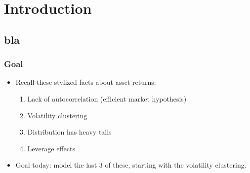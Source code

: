 

\frame{\titlepage}


\section{Introduction}\subsection*{bla}

\begin{frame}
\frametitle{Goal}
\begin{itemize}
\item Recall these stylized facts about asset returns:
\begin{enumerate}
\item Lack of autocorrelation (efficient market hypothesis)
\item Volatility clustering
\item Distribution has heavy tails
\item Leverage effects
\end{enumerate}
\item Goal today: model the last 3 of these, starting with the volatility clustering.
\end{itemize}
\end{frame}


